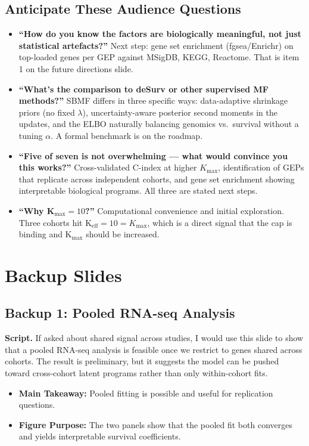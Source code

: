 \documentclass[11pt]{article}
\newcommand{\scriptlabel}{\textbf{Script. }}
\newcommand{\sectionlabel}[1]{\textbf{#1}}
\begin{document}
\subsection*{Anticipate These Audience Questions}

\begin{itemize}
  \item \textbf{``How do you know the factors are biologically meaningful, not just statistical artefacts?''} Next step: gene set enrichment (fgsea/Enrichr) on top-loaded genes per GEP against MSigDB, KEGG, Reactome. That is item 1 on the future directions slide.
  \item \textbf{``What's the comparison to deSurv or other supervised MF methods?''} SBMF differs in three specific ways: data-adaptive shrinkage priors (no fixed $\lambda$), uncertainty-aware posterior second moments in the updates, and the ELBO naturally balancing genomics vs.\ survival without a tuning $\alpha$. A formal benchmark is on the roadmap.
  \item \textbf{``Five of seven is not overwhelming --- what would convince you this works?''} Cross-validated C-index at higher $K_\text{max}$, identification of GEPs that replicate across independent cohorts, and gene set enrichment showing interpretable biological programs. All three are stated next steps.
  \item \textbf{``Why K$_\text{max} = 10$?''} Computational convenience and initial exploration. Three cohorts hit K$_\text{eff} = 10 = K_\text{max}$, which is a direct signal that the cap is binding and K$_\text{max}$ should be increased.
\end{itemize}

\section*{Backup Slides}

\subsection*{Backup 1: Pooled RNA-seq Analysis}
\scriptlabel If asked about shared signal across studies, I would use this slide to show that a pooled RNA-seq analysis is feasible once we restrict to genes shared across cohorts. The result is preliminary, but it suggests the model can be pushed toward cross-cohort latent programs rather than only within-cohort fits.

\begin{itemize}
\item \sectionlabel{Main Takeaway:} Pooled fitting is possible and useful for replication questions.
\item \sectionlabel{Figure Purpose:} The two panels show that the pooled fit both converges and yields interpretable survival coefficients.
\end{itemize}
\end{document}
